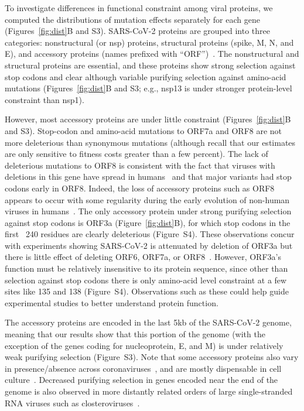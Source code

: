 \documentclass[9pt,twocolumn,twoside]{gsajnl_modified}
\begin{document}
To investigate differences in functional constraint among viral proteins, we computed the distributions of mutation effects separately for each gene (Figures~\ref{fig:dist}B and S3).
SARS-CoV-2 proteins are grouped into three categories: nonstructural (or nsp) proteins, structural proteins (spike, M, N, and E), and accessory proteins (names prefixed with ``ORF'')~\citep{v2021coronavirus}.
The nonstructural and structural proteins are essential, and these proteins show strong selection against stop codons and clear although variable purifying selection against amino-acid mutations (Figures~\ref{fig:dist}B and S3; e.g., nsp13 is under stronger protein-level constraint than nsp1).

However, most accessory proteins are under little constraint (Figures~\ref{fig:dist}B and S3).
Stop-codon and amino-acid mutations to ORF7a and ORF8 are not more deleterious than synonymous mutations (although recall that our estimates are only sensitive to fitness costs greater than a few percent).
The lack of deleterious mutations to ORF8 is consistent with the fact that viruses with deletions in this gene have spread in humans~\citep{su2020discovery} and that major variants had stop codons early in ORF8.
Indeed, the loss of accessory proteins such as ORF8 appears to occur with some regularity during the early evolution of non-human viruses in humans~\citep{rochman2022molecular}.
The only accessory protein under strong purifying selection against stop codons is ORF3a (Figure~\ref{fig:dist}B), for which stop codons in the first ~240 residues are clearly deleterious (Figure~S4).
These observations concur with experiments showing SARS-CoV-2 is attenuated by deletion of ORF3a but there is little effect of deleting ORF6, ORF7a, or ORF8~\citep{mcgrath2022sars,silvas2021contribution,liu2022live}.
However, ORF3a's function must be relatively insensitive to its protein sequence, since other than selection against stop codons there is only amino-acid level constraint at a few sites like 135 and 138 (Figure~S4).
Observations such as these could help guide experimental studies to better understand protein function.

The accessory proteins are encoded in the last 5kb of the SARS-CoV-2 genome, meaning that our results show that this portion of the genome (with the exception of the genes coding for nucleoprotein, E, and M) is under relatively weak purifying selection (Figure~S3).
Note that some accessory proteins also vary in presence/absence across coronaviruses~\citep{v2021coronavirus,llanes2020betacoronavirus}, and are mostly dispensable in cell culture~\citep{mcgrath2022sars,silvas2021contribution,liu2022live,liu2014accessory}.
Decreased purifying selection in genes encoded near the end of the genome is also observed in more distantly related orders of large single-stranded RNA viruses such as closteroviruses~\citep{wang2011genetic, dawson2013virus}.
\end{document}

